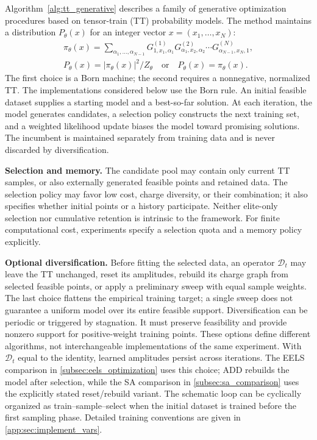 Algorithm~\ref{alg:tt_generative} describes a family of generative optimization
procedures based on tensor-train (TT) probability models. The method maintains
a distribution $P_\theta(x)$ for an integer vector $x=(x_1,\ldots,x_N)$:
\begin{equation}
\begin{gathered}
\pi_\theta(x)=\sum_{\alpha_1,\ldots,\alpha_{N-1}}
G^{(1)}_{1,x_1,\alpha_1}G^{(2)}_{\alpha_1,x_2,\alpha_2}\cdots
G^{(N)}_{\alpha_{N-1},x_N,1},\\
P_\theta(x)=|\pi_\theta(x)|^2/Z_\theta
\quad\text{or}\quad P_\theta(x)=\pi_\theta(x).
\label{eq:tt-def}
\end{gathered}
\end{equation}
The first choice is a Born machine; the second requires a nonnegative,
normalized TT. The implementations considered below use the Born rule.
An initial feasible dataset supplies a starting model and a best-so-far
solution. At each iteration, the model generates candidates, a selection
policy constructs the next training set, and a weighted likelihood update
biases the model toward promising solutions. The incumbent is maintained
separately from training data and is never discarded by diversification.

\textbf{Selection and memory.} The candidate pool may contain only current
TT samples, or also externally generated feasible points and retained data.
The selection policy may favor low cost, charge diversity, or their combination;
it also specifies whether initial points or a history participate. Neither
elite-only selection nor cumulative retention is intrinsic to the framework.
For finite computational cost, experiments specify a selection quota and a
memory policy explicitly.

\textbf{Optional diversification.} Before fitting the selected data, an
operator $\mathcal D_t$ may leave the TT unchanged, reset its amplitudes,
rebuild its charge graph from selected feasible points, or apply a preliminary
sweep with equal sample weights. The last choice flattens the empirical
training target; a single sweep does not guarantee a uniform model over its
entire feasible support. Diversification can be periodic or triggered by
stagnation. It must preserve feasibility and provide nonzero support for
positive-weight training points. These options define different algorithms,
not interchangeable implementations of the same experiment.
With $\mathcal D_t$ equal to the identity, learned amplitudes persist across
iterations. The EELS comparison in \cref{subsec:eels_optimization} uses this
choice; ADD rebuilds the model after selection, while the SA comparison in
\cref{subsec:sa_comparison} uses the explicitly stated reset/rebuild variant.
The schematic loop can be cyclically organized as train--sample--select
when the initial dataset is trained before the first sampling phase.
Detailed training conventions are given in \cref{app:sec:implement_vars}.

